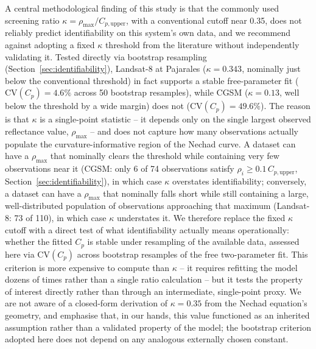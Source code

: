 \documentclass[remotesensing,article,submit,pdftex,moreauthors]{Definitions/mdpi}
\begin{document}
A central methodological finding of this study is that the commonly
used screening ratio $\kappa = \rho_{\max}/C_{p,\text{upper}}$, with a
conventional cutoff near 0.35, does not reliably predict identifiability
on this system's own data, and we recommend against adopting a fixed
$\kappa$ threshold from the literature without independently validating
it. Tested directly via bootstrap resampling
(Section~\ref{sec:identifiability}), Landsat-8 at Pajarales
($\kappa = 0.343$, nominally just below the conventional threshold) in
fact supports a stable free-parameter fit ($\mathrm{CV}(C_p) = 4.6\%$
across 50 bootstrap resamples), while CGSM ($\kappa = 0.13$, well below
the threshold by a wide margin) does not
($\mathrm{CV}(C_p) = 49.6\%$). The reason is that $\kappa$ is a
single-point statistic -- it depends only on the single largest observed
reflectance value, $\rho_{\max}$ -- and does not capture how many
observations actually populate the curvature-informative region of the
Nechad curve. A dataset can have a $\rho_{\max}$ that nominally clears
the threshold while containing very few observations near it (CGSM:
only 6 of 74 observations satisfy $\rho_i \geq 0.1\,C_{p,\text{upper}}$,
Section~\ref{sec:identifiability}), in which case $\kappa$ overstates
identifiability; conversely, a dataset can have a $\rho_{\max}$ that
nominally falls short while still containing a large, well-distributed
population of observations approaching that maximum (Landsat-8: 73 of
110), in which case $\kappa$ understates it. We therefore replace the
fixed $\kappa$ cutoff with a direct test of what identifiability
actually means operationally: whether the fitted $C_p$ is stable under
resampling of the available data, assessed here via $\mathrm{CV}(C_p)$
across bootstrap resamples of the free two-parameter fit. This
criterion is more expensive to compute than $\kappa$ -- it requires
refitting the model dozens of times rather than a single ratio
calculation -- but it tests the property of interest directly rather
than through an intermediate, single-point proxy. We are not aware of
a closed-form derivation of $\kappa = 0.35$ from the Nechad equation's
geometry, and emphasise that, in our hands, this value functioned as
an inherited assumption rather than a validated property of the model;
the bootstrap criterion adopted here does not depend on any analogous
externally chosen constant.
\end{document}
